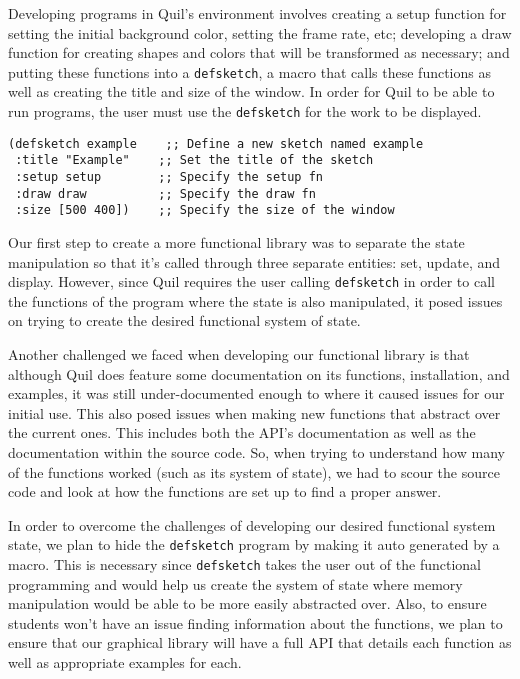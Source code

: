 \documentclass[12pt]{article}
\begin{document}
Developing programs in Quil’s environment involves creating a setup function for setting the initial background color, setting the frame rate, etc; developing a draw function for creating shapes and colors that will be transformed as necessary; and putting these functions into a \texttt{defsketch}, a macro that calls these functions as well as creating the title and size of the window. In order for Quil to be able to run programs, the user must use the \texttt{defsketch} for the work to be displayed.
\begin{verbatim}
(defsketch example    ;; Define a new sketch named example
 :title "Example"    ;; Set the title of the sketch
 :setup setup        ;; Specify the setup fn
 :draw draw          ;; Specify the draw fn
 :size [500 400])    ;; Specify the size of the window
\end{verbatim}
Our first step to create a more functional library was to separate the state manipulation so that it’s called through three separate entities: set, update, and display. However, since Quil requires the user calling \texttt{defsketch} in order to call the functions of the program where the state is also manipulated, it posed issues on trying to create the desired functional system of state. 

Another challenged we faced when developing our functional library is that although Quil does feature some documentation on its functions, installation, and examples, it was still under-documented enough to where it caused issues for our initial use. This also posed issues when making new functions that abstract over the current ones. This includes both the API’s documentation as well as the documentation within the source code. So, when trying to understand how many of the functions worked (such as its system of state), we had to scour the source code and look at how the functions are set up to find a proper answer. 

In order to overcome the challenges of developing our desired functional system state, we plan to hide the \texttt{defsketch} program by making it auto generated by a macro. This is necessary since \texttt{defsketch} takes the user out of the functional programming and would help us create the system of state where memory manipulation would be able to be more easily abstracted over. Also, to ensure students won’t have an issue finding information about the functions, we plan to ensure that our graphical library will have a full API that details each function as well as appropriate examples for each. 
\end{document}
